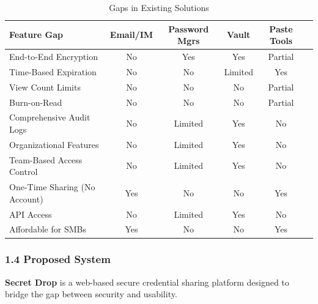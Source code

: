 \documentclass[12pt,a4paper]{article}
\begin{document}
\begin{table}[H]
  \centering
  \small
  \caption{Gaps in Existing Solutions}
  \begin{tabular}{@{}lccccc@{}}
    \toprule
    \textbf{Feature Gap}          & \textbf{Email/IM} & \textbf{Password Mgrs} & \textbf{Vault} & \textbf{Paste Tools} \\
    \midrule
    End-to-End Encryption         & No                & Yes                    & Yes            & Partial              \\
    \hline
    Time-Based Expiration         & No                & No                     & Limited        & Yes                  \\
    \hline
    View Count Limits             & No                & No                     & No             & Partial              \\
    \hline
    Burn-on-Read                  & No                & No                     & No             & Partial              \\
    \hline
    Comprehensive Audit Logs      & No                & Limited                & Yes            & No                   \\
    \hline
    Organizational Features       & No                & Limited                & Yes            & No                   \\
    \hline
    Team-Based Access Control     & No                & Limited                & Yes            & No                   \\
    \hline
    One-Time Sharing (No Account) & Yes               & No                     & No             & Yes                  \\
    \hline
    API Access                    & No                & Limited                & Yes            & No                   \\
    \hline
    Affordable for SMBs           & Yes               & No                     & No             & Yes                  \\
    \bottomrule
  \end{tabular}
\end{table}

\subsubsection*{1.4 Proposed System}

\textbf{Secret Drop} is a web-based secure credential sharing platform designed to bridge the gap between security and usability.
\end{document}
